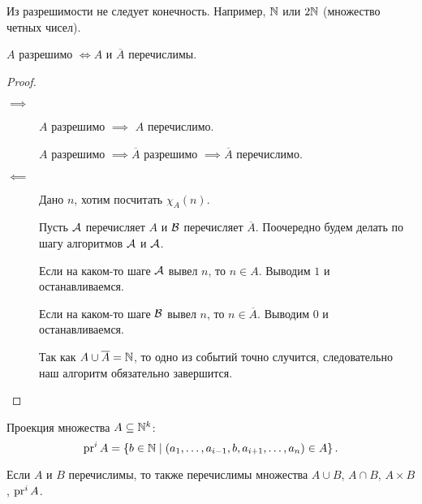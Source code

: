 \begin{proposition}
    Из разрешимости не следует конечность. Например, $\mathbb{N}$ или $2\mathbb{N}$ (множество четных чисел).
\end{proposition}

\begin{theorem}[Поста]
    $A$ разрешимо $\iff A$ и $\overline{A}$ перечислимы.
\end{theorem}

\begin{proof}~
    \begin{description}
    \item[$\implies$]
        $A$ разрешимо $\implies$ $A$ перечислимо. 

        $A$ разрешимо $\implies \overline{A} $ разрешимо $\implies \overline{A}$ перечислимо.
    \item[$\impliedby$]
        Дано $n$, хотим посчитать $\chi_A(n)$.

        Пусть $\mathcal{A}$ перечисляет $A$ и $\mathcal{B}$ перечисляет $\overline{A}$.
        Поочередно будем делать по шагу алгоритмов $\mathcal{A}$ и $\mathcal{A}$.

        Если на каком-то шаге $\mathcal{A}$ вывел $n$, то $n \in A$. Выводим $1$ и останавливаемся.

        Если на каком-то шаге $\mathcal{B}$ вывел $n$, то $n \in \overline{A}$. Выводим $0$ и останавливаемся.

        Так как $A \cup \overline{A} = \mathbb{N}$, то одно из событий точно случится, следовательно наш алгоритм обязательно завершится.
        \qedhere
    \end{description}
\end{proof}

\begin{definition}
    Проекция множества $A \subseteq \mathbb{N}^k$:
    \begin{equation*}
        \operatorname{\mathop{\mathrm{pr}}}^i A = \left\{b \in \mathbb{N} \mid (a_1, \dots, a_{i - 1}, b, a_{i + 1}, \dots, a_n) \in A\right\}
    .\end{equation*}
\end{definition}

\begin{proposition}
    Если $A$ и $B$ перечислимы, то также перечислимы множества $A \cup B$, $A \cap B$, $A \times B$, $\operatorname{\mathop{\mathrm{pr}}}^i A$.
\end{proposition}

